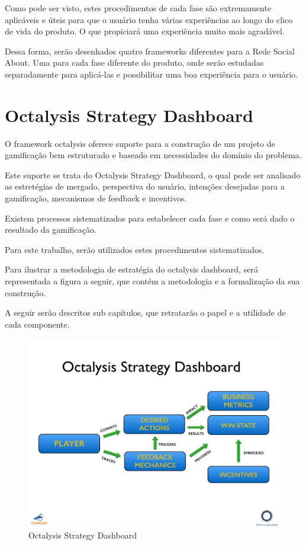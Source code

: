 Como pode ser visto, estes procedimentos de cada fase são extremamente aplicáveis
e úteis para que o usuário tenha várias experiências ao longo do clico de vida do
produto. O que propiciará uma experiência muito mais agradável.

Dessa forma, serão desenhados quatro frameworks diferentes para a Rede Social About.
Uma para cada fase diferente do produto, onde serão estudadas separadamente para
aplicá-las e possibilitar uma boa experiência para o usuário.

\section{Octalysis Strategy Dashboard}
\label{sec:octalysisdashborad}
O framework octalysis oferece suporte para a construção de um projeto de gamificação
bem estruturado e baseado em necessidades do domínio do problema.

Este suporte se trata do Octalysis Strategy Dashboard, o qual pode ser analisado as
estretégias de mergado, perspectiva do usuário, intenções desejadas para a gamificação,
mecanismos de feedback e incentivos.

Existem processos sistematizados para estabelecer cada fase e como será dado o 
resultado da gamificação. 

Para este trabalho, serão utilizados estes procedimentos sistematizados. 

Para ilustrar a metodologia de estratégia do octalysis dashboard, será representada
a figura a seguir, que contém a metodologia e a formalização da sua construção.

A seguir serão descritos sub capítulos, que retratarão o papel e a utilidade de cada
componente.


 \begin{figure}[h]
     \centering

     \includegraphics[width=450px, scale=1]{figuras/dashboard}
     \caption{Octalysis Strategy Dashboard}

     \label{fig:dashboard}
 \end{figure}

